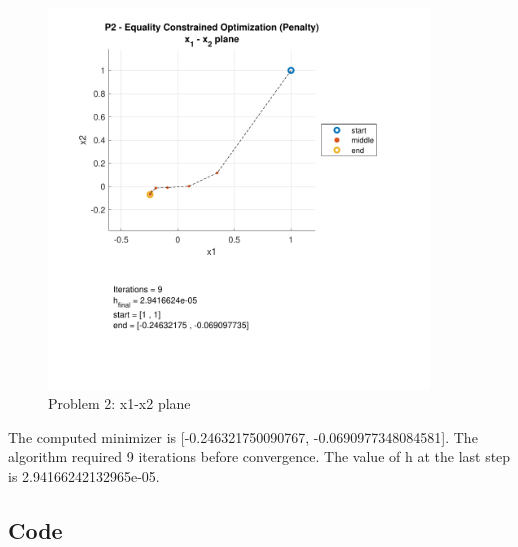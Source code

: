 \documentclass[conf]{new-aiaa}
\begin{document}
\begin{figure}[H]
	\begin{center}
		\includegraphics[width=0.9\textwidth]{P2 - Equality Constrained Optimization (Penalty) - x_1 - x_2 plane.pdf}
	\end{center}
	\caption{Problem 2: x1-x2 plane}
\end{figure}

The computed minimizer is [-0.246321750090767, -0.0690977348084581]. The algorithm required 9 iterations before convergence. The value of h at the last step is 2.94166242132965e-05. 

\subsection{Code}
\end{document}
